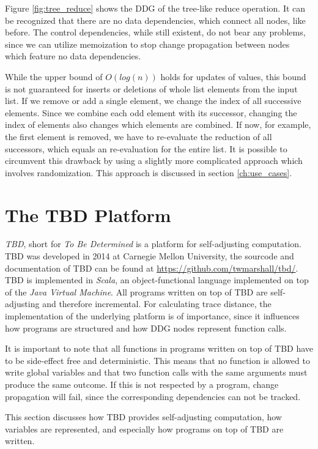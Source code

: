 Figure \ref{fig:tree_reduce} shows the DDG of the tree-like reduce operation. It can be recognized that there are no data dependencies, which connect all nodes, like before. The control dependencies, while still existent, do not bear any problems, since we can utilize memoization to stop change propagation between nodes which feature no data dependencies. 

While the upper bound of $O(log(n))$ holds for updates of values, this bound is not guaranteed for inserts or deletions of whole list elements from the input list. If we remove or add a single element, we change the index of all successive elements. Since we combine each odd element with its successor, changing the index of elements also changes which elements are combined. If now, for example, the first element is removed, we have to re-evaluate the reduction of all successors, which equals an re-evaluation for the entire list. 
It is possible to circumvent this drawback by using a slightly more complicated approach which involves randomization. This approach is discussed in section \ref{ch:use_cases}. 

\chapter{The TBD Platform}
\label{ch:tbd_platform}

\textit{TBD}, short for \textit{To Be Determined} is a platform for self-adjusting computation. TBD was developed in 2014 at Carnegie Mellon University, the sourcode and documentation of TBD can be found at \url{https://github.com/twmarshall/tbd/}. TBD is implemented in \textit{Scala}, an object-functional language implemented on top of the \textit{Java Virtual Machine}. All programs written on top of TBD are self-adjusting and therefore incremental. For calculating trace distance, the implementation of the underlying platform is of importance, since it influences how programs are structured and how DDG nodes represent function calls. 

It is important to note that all functions in programs written on top of TBD have to be side-effect free and deterministic. This means that no function is allowed to write global variables and that two function calls with the same arguments must produce the same outcome. If this is not respected by a program, change propagation will fail, since the corresponding dependencies can not be tracked. 

This section discusses how TBD provides self-adjusting computation, how variables are represented, and especially how programs on top of TBD are written. 

